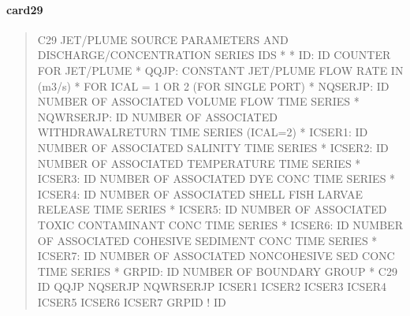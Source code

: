 \documentclass[letterpaper,10pt,english]{sphinxmanual}
\begin{document}
\paragraph{card29}
\label{\detokenize{inputfiles/runcontrol/card29:card29}}\label{\detokenize{inputfiles/runcontrol/card29::doc}}\begin{quote}

\begin{sphinxVerbatim}[commandchars=\\\{\}]
\PYGZhy{}\PYGZhy{}\PYGZhy{}\PYGZhy{}\PYGZhy{}\PYGZhy{}\PYGZhy{}\PYGZhy{}\PYGZhy{}\PYGZhy{}\PYGZhy{}\PYGZhy{}\PYGZhy{}\PYGZhy{}\PYGZhy{}\PYGZhy{}\PYGZhy{}\PYGZhy{}\PYGZhy{}\PYGZhy{}\PYGZhy{}\PYGZhy{}\PYGZhy{}\PYGZhy{}\PYGZhy{}\PYGZhy{}\PYGZhy{}\PYGZhy{}\PYGZhy{}\PYGZhy{}\PYGZhy{}\PYGZhy{}\PYGZhy{}\PYGZhy{}\PYGZhy{}\PYGZhy{}\PYGZhy{}\PYGZhy{}\PYGZhy{}\PYGZhy{}\PYGZhy{}\PYGZhy{}\PYGZhy{}\PYGZhy{}\PYGZhy{}\PYGZhy{}\PYGZhy{}\PYGZhy{}\PYGZhy{}\PYGZhy{}\PYGZhy{}\PYGZhy{}\PYGZhy{}\PYGZhy{}\PYGZhy{}\PYGZhy{}\PYGZhy{}\PYGZhy{}\PYGZhy{}\PYGZhy{}\PYGZhy{}\PYGZhy{}\PYGZhy{}\PYGZhy{}\PYGZhy{}\PYGZhy{}\PYGZhy{}\PYGZhy{}\PYGZhy{}\PYGZhy{}\PYGZhy{}\PYGZhy{}\PYGZhy{}\PYGZhy{}\PYGZhy{}\PYGZhy{}\PYGZhy{}\PYGZhy{}
C29 JET/PLUME SOURCE PARAMETERS AND DISCHARGE/CONCENTRATION SERIES IDS
*
*        ID: ID COUNTER FOR JET/PLUME
*      QQJP: CONSTANT JET/PLUME FLOW RATE IN (m\PYGZca{}3/s)
*              FOR ICAL = 1 OR 2  (FOR SINGLE PORT)
*   NQSERJP: ID NUMBER OF ASSOCIATED VOLUME FLOW TIME SERIES
* NQWRSERJP: ID NUMBER OF ASSOCIATED WITHDRAWAL\PYGZhy{}RETURN TIME SERIES (ICAL=2)
*    ICSER1: ID NUMBER OF ASSOCIATED SALINITY TIME SERIES
*    ICSER2: ID NUMBER OF ASSOCIATED TEMPERATURE TIME SERIES
*    ICSER3: ID NUMBER OF ASSOCIATED DYE CONC TIME SERIES
*    ICSER4: ID NUMBER OF ASSOCIATED SHELL FISH LARVAE RELEASE TIME SERIES
*    ICSER5: ID NUMBER OF ASSOCIATED TOXIC CONTAMINANT CONC TIME SERIES
*    ICSER6: ID NUMBER OF ASSOCIATED COHESIVE SEDIMENT CONC TIME SERIES
*    ICSER7: ID NUMBER OF ASSOCIATED NON\PYGZhy{}COHESIVE SED CONC TIME SERIES
*     GRPID: ID NUMBER OF BOUNDARY GROUP
*
C29      ID    QQJP NQSERJP NQWRSERJP ICSER1 ICSER2  ICSER3  ICSER4  ICSER5  ICSER6  ICSER7      GRPID ! ID
\end{sphinxVerbatim}
\end{quote}
\end{document}
